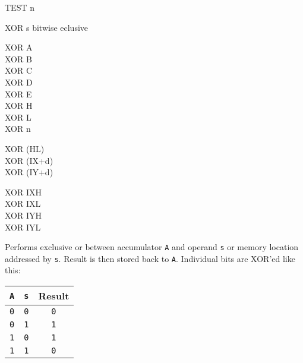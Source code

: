 \begin{basedescript}{
    \desclabelstyle{\multilinelabel}
    \desclabelwidth{3cm}}
\begin{DetailItem}{TEST n\ZXN}
    \end{DetailItem}

    \pagebreak
    \begin{DetailItem}{XOR s}
        {bitwise eclusive }
        {}

        \begin{DetailVariants}
            XOR A\\
            XOR B\\
            XOR C\\
            XOR D\\
            XOR E\\
            XOR H\\
            XOR L\\
            XOR n

            \columnbreak
            XOR (HL)\\
            XOR (IX+d)\\
            XOR (IY+d)

            \columnbreak
            XOR IXH\UNDOC\\
            XOR IXL\UNDOC\\
            XOR IYH\UNDOC\\
            XOR IYL\UNDOC
        \end{DetailVariants}

        Performs exclusive or between accumulator {\tt A} and operand {\tt s} or memory location addressed by {\tt s}. Result is then stored back to {\tt A}. Individual bits are XOR'ed like this:

        \begin{tabular}{cc|c}
            {\tt A} & {\tt s} & Result \\
            \hline
            {\tt 0} & {\tt 0} & {\tt 0} \\
            {\tt 0} & {\tt 1} & {\tt 1} \\
            {\tt 1} & {\tt 0} & {\tt 1} \\
            {\tt 1} & {\tt 1} & {\tt 0} \\
        \end{tabular}

        \begin{DetailEffects}[p]
            \FlagsXORr
        \end{DetailEffects}
						
        \begin{DetailTiming}
        \end{DetailTiming}

    \end{DetailItem}

\end{basedescript}


\pagebreak
\IntentionallyEmpty
\pagebreak
